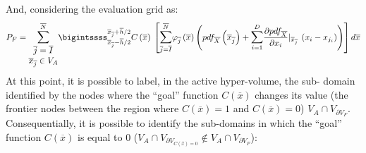 And, considering the evaluation grid as:
\begin{equation}
\label{eq:PfEq}
P_{F}= \mathlarger{\sum}_{\begin{matrix}
\overline{j}=\overline{I} \\ \overline{x}_{\overline{j}} \in V_{A} \end{matrix}}^{\overline{N}} 
\bigintssss_{\overline{x}_{\overline{j}} - \overline{h}/2}^{\overline{x}_{\overline{j}} + \overline{h}/2} C\left ( \overline{x} \right )\: 
\left [  \mathlarger{\sum}_{\overline{j}=\overline{I}}^{\overline{N}}\varphi_{\overline{j}}\left ( \overline{x} \right )
\left ( pdf_{\overline{X}}\left ( \overline{x}_{\overline{j}} \right ) +
\mathlarger{\sum}_{i=1}^{D} \frac{\partial pdf_{\overline{X}}}{\partial x_{i}}|_{\overline{x}_{\overline{j}}} \: \left ( x_{i} - x_{j_{i}} \right ) \right ) \right ] d\overline{x}
\end{equation}
At this point, it is possible to label, in the active hyper-volume, the sub-
domain identified by the nodes where the ``goal'' function  
$C(\overline{x})$ changes its value (the frontier nodes between the 
region where $C(\overline{x})=1$ and $C(\overline{x})=0$) $V_{A} \cap 
V_{\partial V_{F}}$.
\\ Consequentially, it is possible to identify the sub-domains in which the  ``goal''  function $C(\overline{x})$ is equal to $0$ ($V_{A} \cap V_{\partial V_{C(\overline{x})=0}} \notin V_{A} \cap V_{\partial V_{F}}$):

